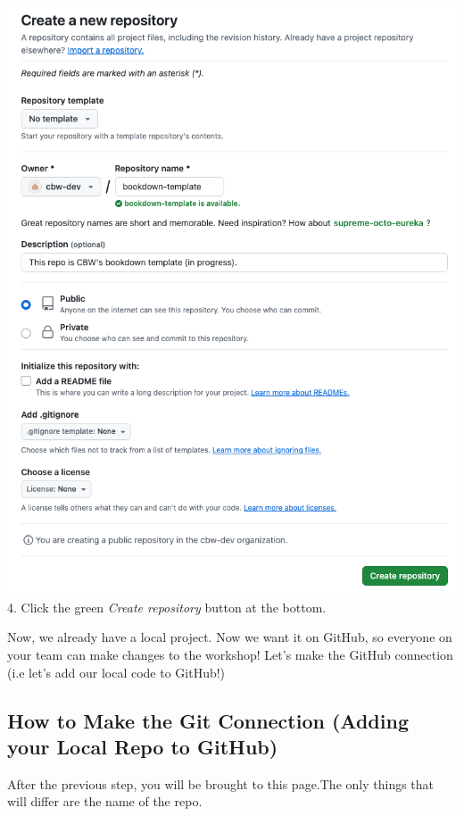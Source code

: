 \documentclass[
]{book}
\theoremstyle{definition}
\theoremstyle{definition}
\theoremstyle{definition}
\theoremstyle{definition}
\theoremstyle{remark}
\begin{document}
\includegraphics{img/git-instruct/create-git-repo.png}
4. Click the green \emph{Create repository} button at the bottom.

Now, we already have a local project. Now we want it on GitHub, so everyone on your team can make changes to the workshop! Let's make the GitHub connection (i.e let's add our local code to GitHub!)

\subsection{How to Make the Git Connection (Adding your Local Repo to GitHub)}\label{how-to-make-the-git-connection-adding-your-local-repo-to-github}

After the previous step, you will be brought to this page.The only things that will differ are the name of the repo.
\end{document}
